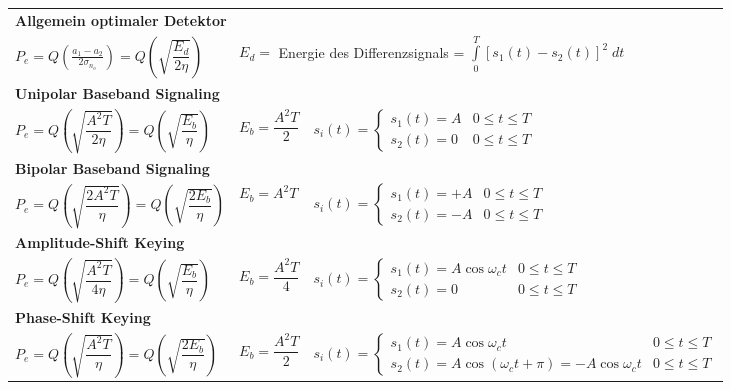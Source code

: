 \renewcommand{\arraystretch}{2}
	\begin{tabular}{ p{6cm} p{2.5cm} p{9cm} }
		
		\multicolumn{3}{l}{\textbf{Allgemein optimaler Detektor}} \\
		$P_e= Q\left(\frac{a_1 - a_2}{2\sigma_{n_o}}\right)  = Q\left(\sqrt{\dfrac{E_d}{2\eta}}\right)$
		& \multicolumn{2}{l}{$E_d =$ Energie des Differenzsignals = $\int\limits_{0}^{T}[s_1(t) - s_2(t)]^2 \; dt$}
		\\
					
		\multicolumn{3}{l}{\textbf{Unipolar Baseband Signaling}} \\
		$ P_e = Q\left(\sqrt{\dfrac{A^2 T}{2 \eta}}\right) = Q\left(\sqrt{\dfrac{E_b}{\eta}}\right) $
		& $ E_b = \dfrac{A^2 T}{2} $
		& $ s_i(t) = \begin{cases}
		     s_1(t) = A & 0 \leq t \leq T \\       
		     s_2(t) = 0 & 0 \leq t \leq T
		   \end{cases}$ \\  

		\multicolumn{3}{l}{\textbf{Bipolar Baseband Signaling}} \\
		$ P_e = Q\left(\sqrt{\dfrac{2 A^2 T}{\eta}}\right) = Q\left(\sqrt{\dfrac{2 E_b}{\eta}}\right) $
		& $ E_b = A^2 T $
		& $ s_i(t) = \begin{cases}
 		     s_1(t) = +A & 0 \leq t \leq T \\       
 		     s_2(t) = -A & 0 \leq t \leq T
 		   \end{cases} $ \\

		\multicolumn{3}{l}{\textbf{Amplitude-Shift Keying}} \\
		$ P_e = Q\left(\sqrt{\dfrac{A^2 T}{4 \eta}}\right) = Q\left(\sqrt{\dfrac{E_b}{\eta}}\right) $
		& $ E_b = \dfrac{A^2 T}{4} $
		& $ s_i(t) = \begin{cases}
 		     s_1(t) = A \cos{\omega_c t} & 0 \leq t \leq T \\       
 		     s_2(t) = 0 & 0 \leq t \leq T
 		   \end{cases} $ \\

		\multicolumn{3}{l}{\textbf{Phase-Shift Keying}} \\
		$ P_e = Q\left(\sqrt{\dfrac{A^2 T}{\eta}}\right) = Q\left(\sqrt{\dfrac{2 E_b}{\eta}}\right)  $
		& $ E_b = \dfrac{A^2 T}{2} $
		& $ s_i(t) = \begin{cases}
 		     s_1(t) = A \cos{\omega_c t} & 0 \leq t \leq T \\       
 		     s_2(t) = A \cos{(\omega_c t + \pi)} = - A \cos{\omega_c t} & 0 \leq t \leq T
 		   \end{cases} $ \\


\end{tabular}
